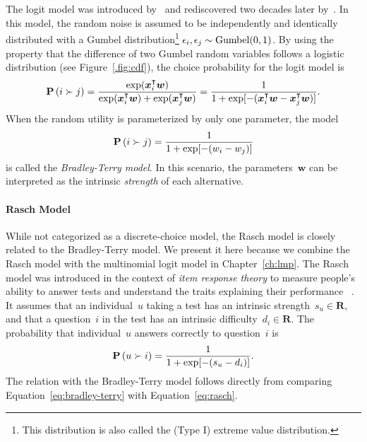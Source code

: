 The logit model was introduced by~\citet{zermelo1928berechnung} and rediscovered two decades later by~\citet{bradley1952rank}.
In this model, the random noise is assumed to be independently and identically distributed with a Gumbel distribution\footnote{This distribution is also called the (Type I) extreme value distribution.} $\epsilon_i, \epsilon_j \sim \mathrm{Gumbel}( 0, 1 )$.
By using the property that the difference of two Gumbel random variables follows a logistic distribution (see Figure~\ref{.fig:cdf}), the choice probability for the logit model is
\begin{equation*}
	\Prob{i \succ j} = \frac{\exp(\bm{x}_i\Tr \bm{w})}{\exp(\bm{x}_i\Tr \bm{w}) + \exp(\bm{x}_j\Tr \bm{w})} = \frac{1}{1 + \exp[-(\bm{x}_i\Tr \bm{w} - \bm{x}_j\Tr \bm{w})]}. %
\end{equation*}
When the random utility is parameterized by only one parameter, the model
\begin{equation}
	\label{eq:bradley-terry}
	\mathbf{P}\left( i \succ j \right) = \frac{1}{1 + \exp[-(w_i - w_j)]}
\end{equation}
is called the \emph{Bradley-Terry model}.
In this scenario, the parameters~$\bm{w}$ can be interpreted as the intrinsic \emph{strength} of each alternative.

\paragraph{Rasch Model}
While not categorized as a discrete-choice model, the Rasch model is closely related to the Bradley-Terry model.
We present it here because we combine the Rasch model with the multinomial logit model in Chapter~\ref{ch:lmp}.
The Rasch model was introduced in the context of \emph{item response theory} to measure people's ability to answer tests and understand the traits explaining their performance~\citep{rasch1993probabilistic} .
It assumes that an individual~$u$ taking a test has an intrinsic strength~$s_u \in \mathbf{R}$, and that a question~$i$ in the test has an intrinsic difficulty~$d_i \in \mathbf{R}$.
The probability that individual~$u$ answers correctly to question~$i$ is
\begin{equation}
	\label{eq:rasch}
	\mathbf{P}\left( u \succ i \right) = \frac{1}{1 + \exp[-(s_u - d_i)]}.
\end{equation}
The relation with the Bradley-Terry model follows directly from comparing Equation~\ref{eq:bradley-terry} with Equation~\ref{eq:rasch}.

